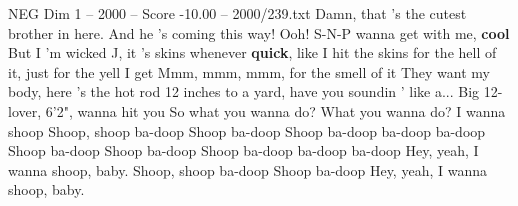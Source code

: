 \begin{textsample}{NEG Dim 1 – 2000 – Score -10.00 – 2000/239.txt}
Damn, that 's the cutest brother in here.
And he 's coming this way!
Ooh!
S-N-P wanna get with me, \textbf{cool} But I 'm wicked J, it 's skins whenever \textbf{quick}, like I hit the skins for the hell of it, just for the yell I get Mmm, mmm, mmm, for the smell of it They want my body, here 's the hot rod 12 inches to a yard, have you soundin ' like a...
Big 12-lover, 6'2", wanna hit you So what you wanna do?
What you wanna do?
I wanna shoop Shoop, shoop ba-doop Shoop ba-doop Shoop ba-doop ba-doop ba-doop Shoop ba-doop Shoop ba-doop Shoop ba-doop ba-doop ba-doop Hey, yeah, I wanna shoop, baby.
Shoop, shoop ba-doop Shoop ba-doop Hey, yeah, I wanna shoop, baby.

\end{textsample}
